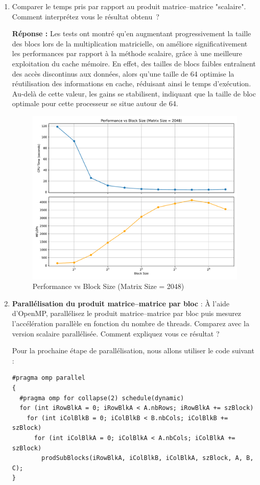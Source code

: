 \documentclass[11pt,a4paper]{article}
\begin{document}
\begin{enumerate}
\item Comparer le temps pris par rapport au produit matrice--matrice "scalaire". Comment interprétez vous le résultat obtenu~?

\textbf{Réponse :} Les tests ont montré qu'en augmentant progressivement la taille des blocs lors de la multiplication matricielle, on améliore significativement les performances par rapport à la méthode scalaire, grâce à une meilleure exploitation du cache mémoire. En effet, des tailles de blocs faibles entraînent des accès discontinus aux données, alors qu'une taille de 64 optimise la réutilisation des informations en cache, réduisant ainsi le temps d'exécution. Au-delà de cette valeur, les gains se stabilisent, indiquant que la taille de bloc optimale pour cette processeur se situe autour de 64.

\begin{figure}[H]
	\centering
	\includegraphics[width=\textwidth]{sizeBlock.pdf}
	\caption{Performance vs Block Size (Matrix Size = 2048)}
\end{figure}

\item \textbf{\color{blue}Parallélisation du produit matrice--matrice par bloc }: \`A l'aide d'OpenMP, parallélisez le produit matrice--matrice par bloc puis mesurez l'accélération parallèle en fonction du nombre de threads. Comparez avec la version scalaire parallélisée. Comment expliquez vous ce résultat ?


Pour la prochaine étape de parallélisation, nous allons utiliser le code suivant :
\begin{lstlisting}[caption={Parallélisation avec OpenMP}, label={lst:parallel}]
#pragma omp parallel
{
  #pragma omp for collapse(2) schedule(dynamic)
  for (int iRowBlkA = 0; iRowBlkA < A.nbRows; iRowBlkA += szBlock)
    for (int iColBlkB = 0; iColBlkB < B.nbCols; iColBlkB += szBlock)
      for (int iColBlkA = 0; iColBlkA < A.nbCols; iColBlkA += szBlock)
        prodSubBlocks(iRowBlkA, iColBlkB, iColBlkA, szBlock, A, B, C);
}
\end{lstlisting}


\end{enumerate}
\end{document}
